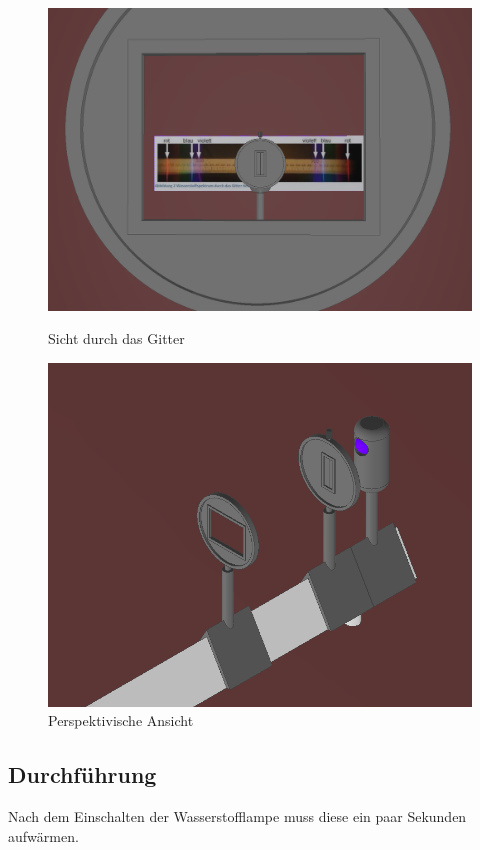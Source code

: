 \documentclass[12pt, a4paper]{article}
\begin{document}
\begin{figure}[p]
    \centering
    
    \includegraphics[width=\textwidth]{Gittersicht.png}
    \caption[Sicht durch das Gitter]{Sicht durch das Gitter}

    \vspace*{\floatsep}

    \includegraphics[width=\textwidth]{Perspektive.png}
    \caption[Perspektivische Ansicht]{Perspektivische Ansicht}
\end{figure}

\newpage

\subsection{Durchführung}
Nach dem Einschalten der Wasserstofflampe muss diese ein paar Sekunden aufwärmen.
\end{document}
